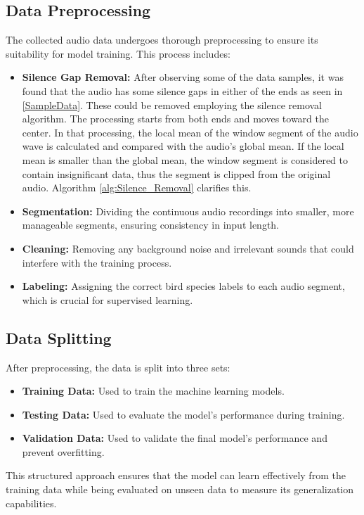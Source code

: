 \subsection{Data Preprocessing}

The collected audio data undergoes thorough preprocessing to ensure its suitability for model training. This process includes:
\begin{itemize}
    \item \textbf{Silence Gap Removal:} After observing some of the data samples, it was found that the audio has some silence gaps in either of the ends as seen in \ref{SampleData}. These could be removed employing the silence removal algorithm. The processing starts from both ends and moves toward the center. In that processing, the local mean of the window segment of the audio wave is calculated and compared with the audio’s global mean. If the local mean is smaller than the global mean, the window segment is considered to contain insignificant data, thus the segment is clipped from the original audio\cite{9850832}. Algorithm \ref{alg:Silence_Removal} clarifies this.
    \item \textbf{Segmentation:} Dividing the continuous audio recordings into smaller, more manageable segments, ensuring consistency in input length.
    \item \textbf{Cleaning:} Removing any background noise and irrelevant sounds that could interfere with the training process.
    \item \textbf{Labeling:} Assigning the correct bird species labels to each audio segment, which is crucial for supervised learning.
\end{itemize}

\subsection{Data Splitting}

After preprocessing, the data is split into three sets:
\begin{itemize}
    \item \textbf{Training Data:} Used to train the machine learning models.
    \item \textbf{Testing Data:} Used to evaluate the model's performance during training.
    \item \textbf{Validation Data:} Used to validate the final model's performance and prevent overfitting.
\end{itemize}

This structured approach ensures that the model can learn effectively from the training data while being evaluated on unseen data to measure its generalization capabilities.

